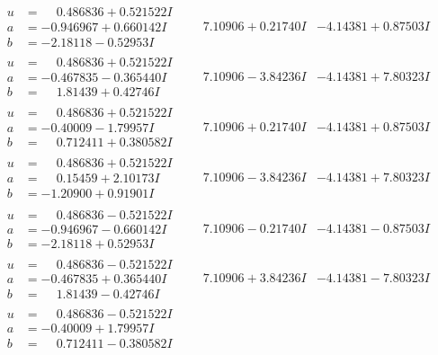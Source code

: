 \documentclass[1p]{elsarticle_modified}
\theoremstyle{definition}
\begin{document}
$$\begin{array}{c|c|c}
\begin{aligned}
u &= \phantom{-}0.486836 + 0.521522 I \\
a &= -0.946967 + 0.660142 I \\
b &= -2.18118 - 0.52953 I\end{aligned}
 & \phantom{-}7.10906 + 0.21740 I & -4.14381 + 0.87503 I \\ \hline\begin{aligned}
u &= \phantom{-}0.486836 + 0.521522 I \\
a &= -0.467835 - 0.365440 I \\
b &= \phantom{-}1.81439 + 0.42746 I\end{aligned}
 & \phantom{-}7.10906 - 3.84236 I & -4.14381 + 7.80323 I \\ \hline\begin{aligned}
u &= \phantom{-}0.486836 + 0.521522 I \\
a &= -0.40009 - 1.79957 I \\
b &= \phantom{-}0.712411 + 0.380582 I\end{aligned}
 & \phantom{-}7.10906 + 0.21740 I & -4.14381 + 0.87503 I \\ \hline\begin{aligned}
u &= \phantom{-}0.486836 + 0.521522 I \\
a &= \phantom{-}0.15459 + 2.10173 I \\
b &= -1.20900 + 0.91901 I\end{aligned}
 & \phantom{-}7.10906 - 3.84236 I & -4.14381 + 7.80323 I \\ \hline\begin{aligned}
u &= \phantom{-}0.486836 - 0.521522 I \\
a &= -0.946967 - 0.660142 I \\
b &= -2.18118 + 0.52953 I\end{aligned}
 & \phantom{-}7.10906 - 0.21740 I & -4.14381 - 0.87503 I \\ \hline\begin{aligned}
u &= \phantom{-}0.486836 - 0.521522 I \\
a &= -0.467835 + 0.365440 I \\
b &= \phantom{-}1.81439 - 0.42746 I\end{aligned}
 & \phantom{-}7.10906 + 3.84236 I & -4.14381 - 7.80323 I \\ \hline\begin{aligned}
u &= \phantom{-}0.486836 - 0.521522 I \\
a &= -0.40009 + 1.79957 I \\
b &= \phantom{-}0.712411 - 0.380582 I\end{aligned}

\end{array}$$
\end{document}
